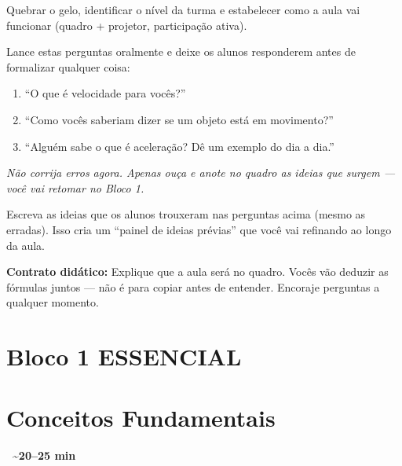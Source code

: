 \documentclass[12pt,a4paper]{article}
\newcommand{\tempo}[1]{%
  \begin{flushright}
    \colorbox{azulphysics!20}{\small\textbf{\faClock\ \textasciitilde{}#1 min}}
  \end{flushright}\vspace{-0.5em}
}
\begin{document}
\begin{tcolorbox}[blocobox={Objetivo}]
  Quebrar o gelo, identificar o n\'ivel da turma e estabelecer como a aula
  vai funcionar (quadro + projetor, participa\c{c}\~ao ativa).
\end{tcolorbox}

\begin{tcolorbox}[perguntabox]
  Lance estas perguntas oralmente e deixe os alunos responderem antes de
  formalizar qualquer coisa:
  \begin{enumerate}[nosep]
    \item ``O que \'e velocidade para voc\^es?''
    \item ``Como voc\^es saberiam dizer se um objeto est\'a em movimento?''
    \item ``Algu\'em sabe o que \'e acelera\c{c}\~ao? D\^e um exemplo do dia a dia.''
  \end{enumerate}
  \textit{N\~ao corrija erros agora. Apenas ouça e anote no quadro as ideias
  que surgem --- voc\^e vai retomar no Bloco 1.}
\end{tcolorbox}

\begin{tcolorbox}[quadrobox]
  Escreva as ideias que os alunos trouxeram nas perguntas acima (mesmo as
  erradas). Isso cria um ``painel de ideias pr\'evias'' que voc\^e vai
  refinando ao longo da aula.
\end{tcolorbox}

\begin{tcolorbox}[dicabox]
  \textbf{Contrato did\'atico:} Explique que a aula ser\'a no quadro.
  Vocês vão deduzir as fórmulas juntos --- não é para copiar antes de
  entender. Encoraje perguntas a qualquer momento.
\end{tcolorbox}

\newpage

\section*{Bloco 1 \hfill\colorbox{verdeok!30}{\small ESSENCIAL}}
\section*{\hspace{1.2em}Conceitos Fundamentais}
\tempo{20--25}
\end{document}
